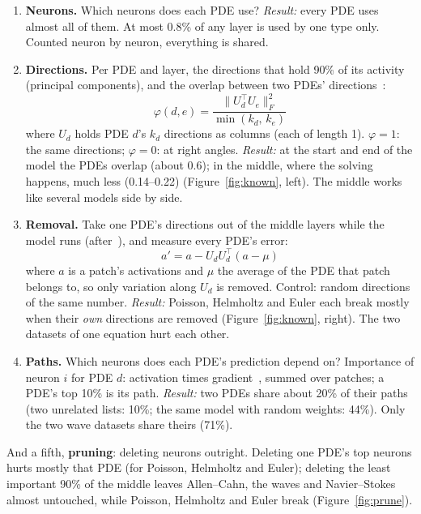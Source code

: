 \documentclass[11pt,a4paper]{article}
\begin{document}
\begin{enumerate}[itemsep=0.8em]
  \item \textbf{Neurons.} Which neurons does each PDE use? \emph{Result:} every PDE uses almost all of them.
  At most 0.8\% of any layer is used by one type only. Counted neuron by neuron, everything is shared.

  \item \textbf{Directions.} Per PDE and layer, the directions that hold 90\% of its activity (principal components),
  and the overlap between two PDEs' directions~\cite{hu2021lora, chang2022}:
  \begin{equation*}
    \varphi(d, e) = \frac{\lVert U_d^{\top} U_e \rVert_F^{2}}{\min(k_d,\, k_e)}
  \end{equation*}
  where $U_d$ holds PDE $d$'s $k_d$ directions as columns (each of length 1). $\varphi = 1$: the same directions; $\varphi = 0$: at right angles.
  \emph{Result:} at the start and end of the model the PDEs overlap (about 0.6); in the middle, where the solving happens,
  much less (0.14--0.22) (Figure~\ref{fig:known}, left). The middle works like several models side by side.

  \item \textbf{Removal.} Take one PDE's directions out of the middle layers while the model runs
  (after~\cite{saha2026}), and measure every PDE's error:
  \begin{equation*}
    a' = a - U_d U_d^{\top} (a - \mu)
  \end{equation*}
  where $a$ is a patch's activations and $\mu$ the average of the PDE that patch belongs to, so only variation along $U_d$ is removed.
  Control: random directions of the same number.
  \emph{Result:} Poisson, Helmholtz and Euler each break mostly when their \emph{own} directions are removed (Figure~\ref{fig:known}, right).
  The two datasets of one equation hurt each other.

  \item \textbf{Paths.} Which neurons does each PDE's prediction depend on? Importance of neuron $i$ for PDE $d$:
  activation times gradient~\cite{dhamdhere2019}, summed over patches; a PDE's top 10\% is its path.
  \emph{Result:} two PDEs share about 20\% of their paths (two unrelated lists: 10\%; the same model with random weights: 44\%).
  Only the two wave datasets share theirs (71\%).
\end{enumerate}

And a fifth, \textbf{pruning}: deleting neurons outright. Deleting one PDE's top neurons hurts mostly that PDE
(for Poisson, Helmholtz and Euler); deleting the least important 90\% of the middle leaves Allen--Cahn, the waves and Navier--Stokes
almost untouched, while Poisson, Helmholtz and Euler break (Figure~\ref{fig:prune}).
\end{document}
